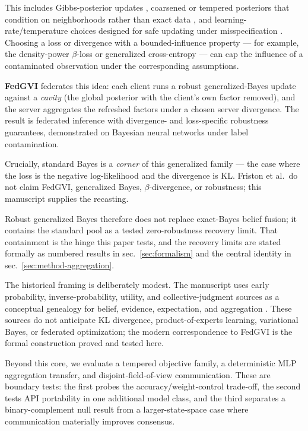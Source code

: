 \documentclass[
  english,
]{article}
\theoremstyle{plain}
\theoremstyle{definition}
\theoremstyle{remark}
\theoremstyle{definition}
\begin{document}
This includes Gibbs-posterior updates \citep{jiang2008gibbs}, coarsened
or tempered posteriors that condition on neighborhoods rather than exact
data \citep{miller2018coarsening}, and learning-rate/temperature choices
designed for safe updating under misspecification
\citep{grunwald2012safe, kleijn2012misspecification}. Choosing a loss or
divergence with a bounded-influence property --- for example, the
density-power \(\beta\)-loss
\citep{basu1998robust, fujisawa2008robust, ghosh2015robust} or
generalized cross-entropy \citep{zhang2018generalized} --- can cap the
influence of a contaminated observation under the corresponding
assumptions.

\textbf{FedGVI} \citep{mildner2025fedgvi} federates this idea: each
client runs a robust generalized-Bayes update against a \emph{cavity}
(the global posterior with the client's own factor removed), and the
server aggregates the refreshed factors under a chosen server
divergence. The result is federated inference with divergence- and
loss-specific robustness guarantees, demonstrated on Bayesian neural
networks under label contamination.

Crucially, standard Bayes is a \emph{corner} of this generalized family
--- the case where the loss is the negative log-likelihood and the
divergence is KL. Friston et al.~do not claim FedGVI, generalized Bayes,
\(\beta\)-divergence, or robustness; this manuscript supplies the
recasting.

Robust generalized Bayes therefore does not replace exact-Bayes belief
fusion; it contains the standard pool as a tested zero-robustness
recovery limit. That containment is the hinge this paper tests, and the
recovery limits are stated formally as numbered results in
sec.~\ref{sec:formalism} and the central identity in
sec.~\ref{sec:method-aggregation}.

The historical framing is deliberately modest. The manuscript uses early
probability, inverse-probability, utility, and collective-judgment
sources as a conceptual genealogy for belief, evidence, expectation, and
aggregation
\citep{pascal1654probability, huygens1657ratiociniis, bernoulli1713ars, demoivre1718doctrine, bayes1763essay, laplace1774memoire, bernoulli1738mensura, condorcet1785essai}.
These sources do not anticipate KL divergence, product-of-experts
learning, variational Bayes, or federated optimization; the modern
correspondence to FedGVI is the formal construction proved and tested
here.

Beyond this core, we evaluate a tempered objective family, a
deterministic MLP aggregation transfer, and disjoint-field-of-view
communication. These are boundary tests: the first probes the
accuracy/weight-control trade-off, the second tests API portability in
one additional model class, and the third separates a binary-complement
null result from a larger-state-space case where communication
materially improves consensus.
\end{document}

